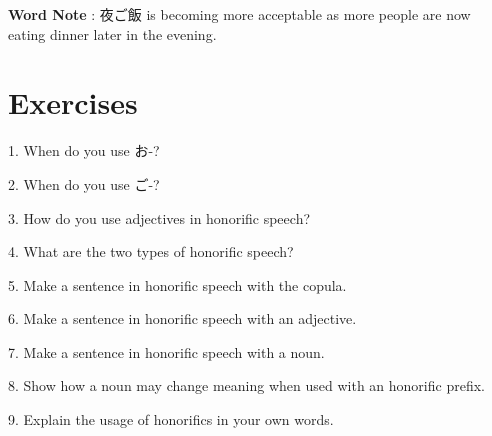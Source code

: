 \par{\textbf{Word Note }: 夜ご飯 is becoming more acceptable as more people are now eating dinner later in the evening.  }
      
\section{Exercises}
 
\par{1. When do you use お-? }

\par{2. When do you use ご-? }

\par{3. How do you use adjectives in honorific speech? }

\par{4. What are the two types of honorific speech? }

\par{5. Make a sentence in honorific speech with the copula. }

\par{6. Make a sentence in honorific speech with an adjective. }

\par{7. Make a sentence in honorific speech with a noun. }

\par{8. Show how a noun may change meaning when used with an honorific prefix. }

\par{9. Explain the usage of honorifics in your own words. }
    